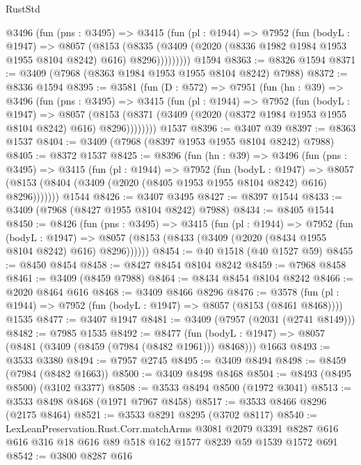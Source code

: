 \begin{lexlean}{RustStd}
\begin{coremodule}
        @3496
          (fun (pns : @3495) =>
          @3415
            (fun (pl : @1944) =>
            @7952
              (fun (bodyL : @1947) =>
              @8057
                (@8153
                  (@8335
                    (@3409 (@2020 (@8336 @1982 @1984 @1953 @1955 @8104 @8242) @616) @8296)))))))))
    @1594
@8363 := @8326 @1594
@8371 := @3409 (@7968 (@8363 @1984 @1953 @1955 @8104 @8242) @7988)
@8372 := @8336 @1594
@8395 := @3581
    (fun (D : @572) =>
    @7951
      (fun (hn : @39) =>
      @3496
        (fun (pns : @3495) =>
        @3415
          (fun (pl : @1944) =>
          @7952
            (fun (bodyL : @1947) =>
            @8057
              (@8153 (@8371 (@3409 (@2020 (@8372 @1984 @1953 @1955 @8104 @8242) @616) @8296))))))))
    @1537
@8396 := @3407 @39
@8397 := @8363 @1537
@8404 := @3409 (@7968 (@8397 @1953 @1955 @8104 @8242) @7988)
@8405 := @8372 @1537
@8425 := @8396
    (fun (hn : @39) =>
    @3496
      (fun (pns : @3495) =>
      @3415
        (fun (pl : @1944) =>
        @7952
          (fun (bodyL : @1947) =>
          @8057 (@8153 (@8404 (@3409 (@2020 (@8405 @1953 @1955 @8104 @8242) @616) @8296)))))))
    @1544
@8426 := @3407 @3495
@8427 := @8397 @1544
@8433 := @3409 (@7968 (@8427 @1955 @8104 @8242) @7988)
@8434 := @8405 @1544
@8450 := @8426
    (fun (pns : @3495) =>
    @3415
      (fun (pl : @1944) =>
      @7952
        (fun (bodyL : @1947) =>
        @8057 (@8153 (@8433 (@3409 (@2020 (@8434 @1955 @8104 @8242) @616) @8296))))))
@8454 := @40 @1518 (@40 @1527 @59)
@8455 := @8450 @8454
@8458 := @8427 @8454 @8104 @8242
@8459 := @7968 @8458
@8461 := @3409 (@8459 @7988)
@8464 := @8434 @8454 @8104 @8242
@8466 := @2020 @8464 @616
@8468 := @3409 @8466 @8296
@8476 := @3578
    (fun (pl : @1944) => @7952 (fun (bodyL : @1947) => @8057 (@8153 (@8461 @8468))))
    @1535
@8477 := @3407 @1947
@8481 := @3409 (@7957 (@2031 (@2741 @8149)))
@8482 := @7985 @1535
@8492 := @8477
    (fun (bodyL : @1947) => @8057 (@8481 (@3409 (@8459 (@7984 (@8482 @1961))) @8468)))
    @1663
@8493 := @3533 @3380
@8494 := @7957 @2745
@8495 := @3409 @8494
@8498 := @8459 (@7984 (@8482 @1663))
@8500 := @3409 @8498 @8468
@8504 := @8493 (@8495 @8500) (@3102 @3377)
@8508 := @3533 @8494 @8500 (@1972 @3041)
@8513 := @3533 @8498 @8468 (@1971 @7967 @8458)
@8517 := @3533 @8466 @8296 (@2175 @8464)
@8521 := @3533 @8291 @8295 (@3702 @8117)
@8540 := LexLeanPreservation.Rust.Corr.matchArms
    @3081
    @2079
    @3391
    @8287
    @616
    @616
    @316
    @18
    @616
    @89
    @518
    @162
    @1577
    @8239
    @59
    @1539
    @1572
    @691
@8542 := @3800 @8287 @616

\end{coremodule}
\end{lexlean}
